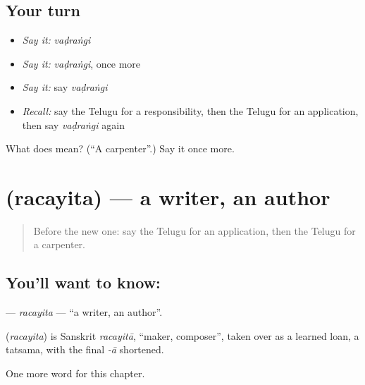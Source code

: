 \subsection*{Your turn}
\begin{itemize}
\raggedright
  \item \emph{Say it:} \emph{vaḍraṅgi}
  \item \emph{Say it:} \emph{vaḍraṅgi}, once more
  \item \emph{Say it:} say \emph{vaḍraṅgi}
  \item \emph{Recall:} say the Telugu for a responsibility, then the Telugu for an application, then say \emph{vaḍraṅgi} again
\end{itemize}

\begin{tcolorbox}[breakable,colback=teal!4,colframe=teal!35!black,title={Before you move on}]
What does  mean? (\textquotedblleft{}A carpenter\textquotedblright{}.) Say it once more.
\end{tcolorbox}
\section[\texorpdfstring{\te{రచయిత} (racayita)}{రచయిత (racayita)}]{ (racayita) — a writer, an author}

\label{lesson:TE-C197-racayita}



\begin{quote}
Before the new one: say the Telugu for an application, then the Telugu for a carpenter.
\end{quote}

\subsection*{You'll want to know: }
\textbf{} — \emph{racayita} — \textquotedblleft{}a writer, an author\textquotedblright{}.

\begin{cousinweb}
\textbf{} (\emph{racayita}) is Sanskrit \emph{racayitā}, \textquotedblleft{}maker, composer\textquotedblright{}, taken over as a learned loan, a tatsama, with the final \emph{-ā} shortened.
\end{cousinweb}

\begin{grammarlens}[title={What you've built}]
One more word for this chapter.
\end{grammarlens}

